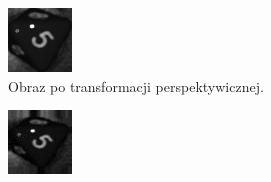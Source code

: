 \begin{figure}[h]
    \begin{subfigure}[t]{0.32\linewidth}
        \centering
        \includegraphics[width=\linewidth]{chapters/04-czytanie/figures/5_shear}
        \caption{Obraz po transformacji perspektywicznej.}
        \label{fig:5shear}
    \end{subfigure}
    \hfill
    \begin{subfigure}[t]{0.32\linewidth}
        \centering
        \includegraphics[width=\linewidth]{chapters/04-czytanie/figures/5_zoom}

\end{subfigure}
\end{figure}
